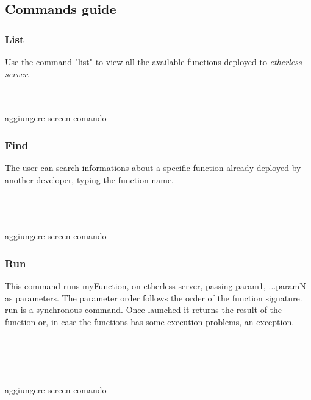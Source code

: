 \subsection{Commands guide}
\subsubsection{List}
Use the command "list" to view all the available functions deployed to \textit{etherless-server}.\\\\
\centerline{}

\\aggiungere screen comando


\subsubsection{Find}
The user can search informations about a specific function already deployed by another developer, typing the function name.\\\\
\centerline{}
\\
\\aggiungere screen comando


\subsubsection{Run}
This command runs myFunction, on etherless-server, passing param1, ...paramN as parameters. The parameter order follows the order of the function signature. run is a synchronous command. Once launched it returns the result of the function or, in case the functions has some execution problems, an exception.\\\\
\centerline{}\\
\\
\\
aggiungere screen comando

